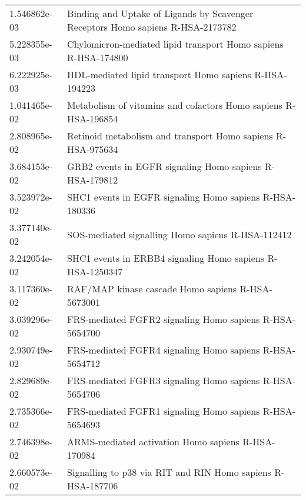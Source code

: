 \begin{longtable}{p{2.4cm}p{14.5cm}}
             1.546862e-03 &               Binding and Uptake of Ligands by Scavenger Receptors Homo sapiens R-HSA-2173782 \\
             5.228355e-03 &                                Chylomicron-mediated lipid transport Homo sapiens R-HSA-174800 \\
             6.222925e-03 &                                        HDL-mediated lipid transport Homo sapiens R-HSA-194223 \\
             1.041465e-02 &                                Metabolism of vitamins and cofactors Homo sapiens R-HSA-196854 \\
             2.808965e-02 &                                   Retinoid metabolism and transport Homo sapiens R-HSA-975634 \\
             3.684153e-02 &                                       GRB2 events in EGFR signaling Homo sapiens R-HSA-179812 \\
             3.523972e-02 &                                       SHC1 events in EGFR signaling Homo sapiens R-HSA-180336 \\
             3.377140e-02 &                                             SOS-mediated signalling Homo sapiens R-HSA-112412 \\
             3.242054e-02 &                                     SHC1 events in ERBB4 signaling Homo sapiens R-HSA-1250347 \\
             3.117360e-02 &                                             RAF/MAP kinase cascade Homo sapiens R-HSA-5673001 \\
             3.039296e-02 &                                       FRS-mediated FGFR2 signaling Homo sapiens R-HSA-5654700 \\
             2.930749e-02 &                                       FRS-mediated FGFR4 signaling Homo sapiens R-HSA-5654712 \\
             2.829689e-02 &                                       FRS-mediated FGFR3 signaling Homo sapiens R-HSA-5654706 \\
             2.735366e-02 &                                       FRS-mediated FGFR1 signaling Homo sapiens R-HSA-5654693 \\
             2.746398e-02 &                                            ARMS-mediated activation Homo sapiens R-HSA-170984 \\
             2.660573e-02 &                                   Signalling to p38 via RIT and RIN Homo sapiens R-HSA-187706 \\

\end{longtable}
